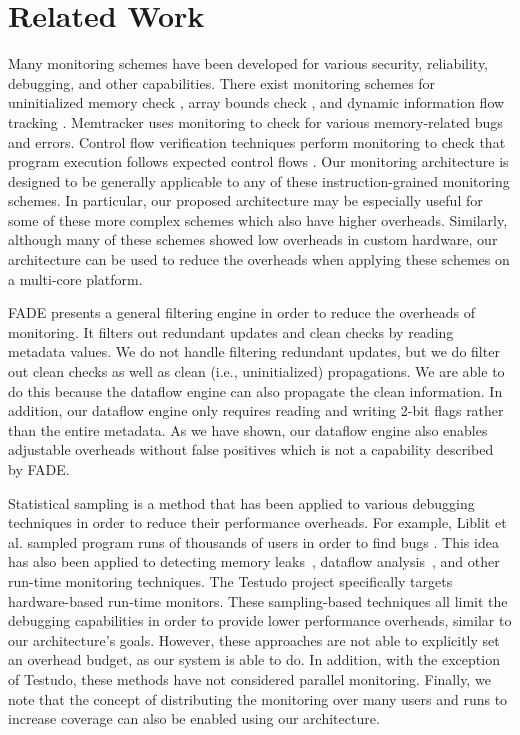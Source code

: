 \section{Related Work}
\label{sec:related}

Many monitoring schemes have been developed for various security, reliability,
debugging, and other capabilities. There exist monitoring schemes for uninitialized
memory check \cite{mondrian-asplos02}, array bounds check
\cite{hardbound-asplos08, clause-ase07}, and dynamic information flow
tracking \cite{dift-asplos04, raksha-isca07, loki-osdi08}.
Memtracker \cite{memtracker-hpca07} uses monitoring to check for various
memory-related bugs and errors.  Control flow verification techniques perform
monitoring to check that program execution follows expected control flows
\cite{schuette-comp87, impres-dac06,
kayaalp-isca12}.  Our monitoring architecture is designed to
be generally applicable to any of these instruction-grained monitoring schemes.
In particular, our proposed architecture may be especially useful for some of
these more complex schemes which also have higher overheads.  Similarly,
although many of these schemes showed low overheads in custom hardware, our
architecture can be used to reduce the overheads when applying these schemes on
a multi-core platform.
 
FADE \cite{fade-hpca14} presents a general filtering engine in order to reduce
the overheads of monitoring. It filters out redundant updates and clean checks
by reading metadata values. We do not handle filtering redundant updates, but
we do filter out clean checks as well as clean (i.e., uninitialized)
propagations.  We are able to do this because the dataflow engine can also
propagate the clean information.  In addition, our dataflow engine only
requires reading and writing 2-bit flags rather than the entire metadata.  As
we have shown, our dataflow engine also enables adjustable overheads without
false positives which is not a capability described by FADE.

Statistical sampling is a method that has been applied to various debugging
techniques in order to reduce their performance overheads. For example, Liblit
et al. sampled program runs of thousands of users in order to find bugs
\cite{liblit-pldi05}. This idea has also been applied to detecting memory
leaks~\cite{chilimbi-asplos04}, dataflow analysis~\cite{greathouse-cgo11}, and
other run-time monitoring techniques. The Testudo project
\cite{testudo-micro08} specifically targets hardware-based run-time monitors.
These sampling-based techniques all limit the debugging capabilities in order
to provide lower performance overheads, similar to our architecture's goals.
However, these approaches are not able to explicitly set an overhead budget, as
our system is able to do. In addition, with the exception of Testudo, these
methods have not considered parallel monitoring. Finally, we note that the
concept of distributing the monitoring over many users and runs to increase
coverage can also be enabled using our architecture.

